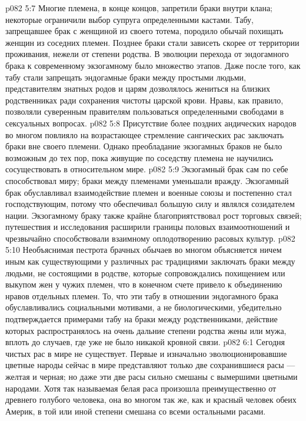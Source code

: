 \vs p082 5:7 Многие племена, в конце концов, запретили браки внутри клана; некоторые ограничили выбор супруга определенными кастами. Табу, запрещавшее брак с женщиной из своего тотема, породило обычай похищать женщин из соседних племен. Позднее браки стали зависеть скорее от территории проживания, нежели от степени родства. В эволюции перехода от эндогамного брака к современному экзогамному было множество этапов. Даже после того, как табу стали запрещать эндогамные браки между простыми людьми, представителям знатных родов и царям дозволялось жениться на близких родственниках ради сохранения чистоты царской крови. Нравы, как правило, позволяли суверенным правителям пользоваться определенными свободами в сексуальных вопросах.
\vs p082 5:8 Присутствие более поздних андических народов во многом повлияло на возрастающее стремление сангических рас заключать браки вне своего племени. Однако преобладание экзогамных браков не было возможным до тех пор, пока живущие по соседству племена не научились сосуществовать в относительном мире.
\vs p082 5:9 Экзогамный брак сам по себе способствовал миру; браки между племенами уменьшали вражду. Экзогамный брак обуславливал взаимодействие племен и военные союзы и постепенно стал господствующим, потому что обеспечивал большую силу и являлся созидателем нации. Экзогамному браку также крайне благоприятствовал рост торговых связей; путешествия и исследования расширили границы половых взаимоотношений и чрезвычайно способствовали взаимному оплодотворению расовых культур.
\vs p082 5:10 Необъяснимая пестрота брачных обычаев во многом объясняется ничем иным как существующими у различных рас традициями заключать браки между людьми, не состоящими в родстве, которые сопровождались похищением или выкупом жен у чужих племен, что в конечном счете привело к объединению нравов отдельных племен. То, что эти табу в отношении эндогамного брака обуславливались социальными мотивами, а не биологическими, убедительно подтверждается примерами табу на браки между родственниками, действие которых распространялось на очень дальние степени родства жены или мужа, вплоть до случаев, где уже не было никакой кровной связи.
\vs p082 6:1 Сегодня чистых рас в мире не существует. Первые и изначально эволюционировавшие цветные народы сейчас в мире представляют только две сохранившиеся расы --- желтая и черная; но даже эти две расы сильно смешаны с вымершими цветными народами. Хотя так называемая белая раса произошла преимущественно от древнего голубого человека, она во многом так же, как и красный человек обеих Америк, в той или иной степени смешана со всеми остальными расами.
